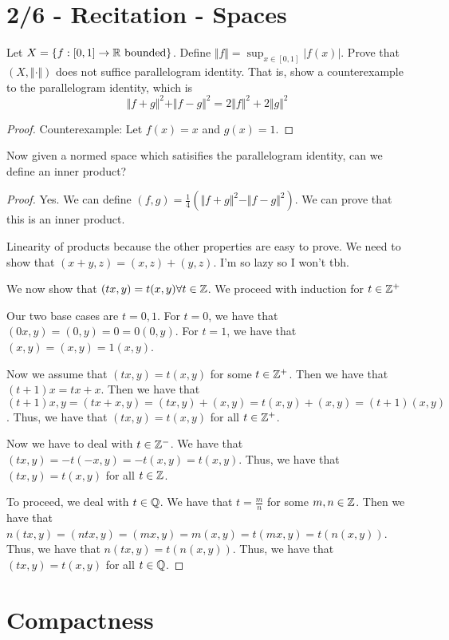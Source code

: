 \documentclass{report}
\begin{document}
\section{2/6 - Recitation - Spaces}
Let $X = \{ f : [0, 1] \to \RR \text{ bounded}\}$. Define $\Vert f \Vert = \sup_{x \in [0, 1]} |f(x)|$. Prove that $(X, \Vert \cdot \Vert)$ does not suffice parallelogram identity. That is, show a counterexample to the parallelogram identity, which is \[ \Vert f + g \Vert^2 + \Vert f - g \Vert^2 = 2\Vert f \Vert^2 + 2\Vert g \Vert^2\]
\begin{proof}
    Counterexample: Let $f(x) = x$ and $g(x) = 1$. 
\end{proof}
Now given a normed space which satisifies the parallelogram identity, can we define an inner product?
\begin{proof}
    Yes. We can define $(f, g) = \frac{1}{4}(\Vert f + g \Vert^2 - \Vert f - g \Vert^2)$. We can prove that this is an inner product.

    Linearity of products because the other properties are easy to prove. We need to show that $(x + y, z) = (x, z) + (y, z)$. I'm so lazy so I won't tbh.

    We now show that $(tx, y) = t(x, y) \forall t \in \ZZ$. We proceed with induction for $t \in \ZZ^+$
    
    Our two base cases are $t = 0, 1$. For $t = 0$, we have that $(0x, y) = (0, y) = 0 = 0(0, y)$. For $t = 1$, we have that $(x, y) = (x, y) = 1(x, y)$.

    Now we assume that $(tx, y) = t(x, y)$ for some $t \in \ZZ^+$. Then we have that $(t+1)x = tx + x$. Then we have that $(t+1)x, y = (tx + x, y) = (tx, y) + (x, y) = t(x, y) + (x, y) = (t+1)(x, y)$. Thus, we have that $(tx, y) = t(x, y)$ for all $t \in \ZZ^+$.

    Now we have to deal with $t \in \ZZ^-$. We have that $(tx, y) = -t(-x, y) = -t(x, y) = t(x, y)$. Thus, we have that $(tx, y) = t(x, y)$ for all $t \in \ZZ$.

    To proceed, we deal with $t \in \QQ$. We have that $t = \frac{m}{n}$ for some $m, n \in \ZZ$. Then we have that $n(tx, y) = (ntx, y) = (mx, y) = m(x, y) = t(mx, y) = t(n(x, y))$. Thus, we have that $n(tx, y) = t(n(x, y))$. Thus, we have that $(tx, y) = t(x, y)$ for all $t \in \QQ$.
\end{proof}


\section{Compactness}
\end{document}
